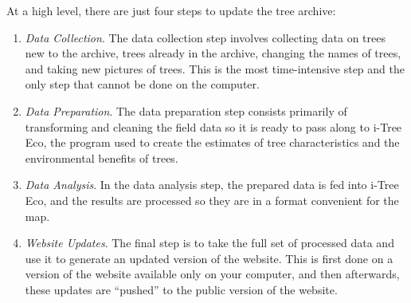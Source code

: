 \documentclass[11pt]{article}
\begin{document}
At a high level, there are just four steps to update the tree archive:
\begin{enumerate}
	\item \emph{Data Collection}. The data collection step involves collecting data on trees new to the archive, trees already in the archive, changing the names of trees, and taking new pictures of trees. This is the most time-intensive step and the only step that cannot be done on the computer.
	\item \emph{Data Preparation}. The data preparation step consists primarily of transforming and cleaning the field data so it is ready to pass along to i-Tree Eco, the program used to create the estimates of tree characteristics and the environmental benefits of trees. 
	\item \emph{Data Analysis}. In the data analysis step, the prepared data is fed into i-Tree Eco, and the results are processed so they are in a format convenient for the map.
	\item \emph{Website Updates}. The final step is to take the full set of processed data and use it to generate an updated version of the website. This is first done on a version of the website available only on your computer, and then afterwards, these updates are ``pushed'' to the public version of the website. 
\end{enumerate}
\end{document}

